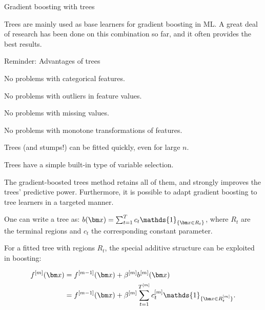 











\begin{vbframe}{Gradient boosting with trees}

Trees are mainly used as base learners for gradient boosting in ML.
A great deal of research has been done on this combination so far, and it often provides the best results.

\begin{blocki}{Reminder: Advantages of trees}
\item No problems with categorical features.
\item No problems with outliers in feature values.
\item No problems with missing values.
\item No problems with monotone transformations of features.
\item Trees (and stumps!) can be fitted quickly, even for large $n$.
\item Trees have a simple built-in type of variable selection.
\end{blocki}
The gradient-boosted trees method retains all of them, and strongly improves the trees' predictive power.
Furthermore, it is possible to adapt gradient boosting to tree learners in a targeted manner.

\framebreak

One can write a tree as: $ b(\xv) = \sum_{t=1}^{T} c_t \mathds{1}_{\{\xv \in R_t\}} $,
where $R_t$ are the terminal regions and $c_t$ the corresponding constant parameter.

\vspace*{0.2cm}

For a fitted tree with regions $R_t$, the special additive structure can be exploited in boosting:  %

\begin{align*}
  \fm(\xv) &= \fmd(\xv) +  \betam \bmm(\xv) \\
         &= \fmd(\xv) +  \betam \sum_{t=1}^{\Tm} \ctm \mathds{1}_{\{\xv \in \Rtm\}}.
\end{align*}


\end{vbframe}
